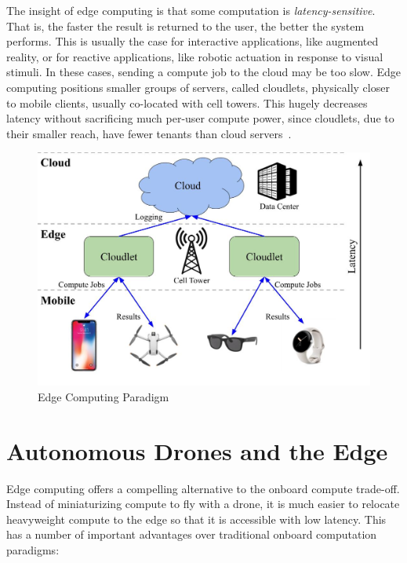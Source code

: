 The insight of edge computing is that some computation is \textit{latency-sensitive}. That is, the faster the result is returned to the user, the better the system performs. This is usually the case for interactive applications, like augmented reality, or for reactive applications, like robotic actuation in response to visual stimuli. In these cases, sending a compute job to the cloud may be too slow. Edge computing positions smaller groups of servers, called cloudlets, physically closer to mobile clients, usually co-located with cell towers. This hugely decreases latency without sacrificing much per-user compute power, since cloudlets, due to their smaller reach, have fewer tenants than cloud servers~\cite{Charyyev2020,Dolui2017}.

\begin{figure}
    \centering
    \includegraphics[width=0.9\linewidth]{chapter3/FIGS/edge-computing.jpg}
    \caption{Edge Computing Paradigm}
    \label{fig:edge-computing}
\end{figure}

\section{Autonomous Drones and the Edge}
\label{sec:drone-and-the-edge}
Edge computing offers a compelling alternative to the onboard compute trade-off. Instead of miniaturizing compute to fly with a drone, it is much easier to relocate heavyweight compute to the edge so that it is accessible with low latency. This has a number of important advantages over traditional onboard computation paradigms:

